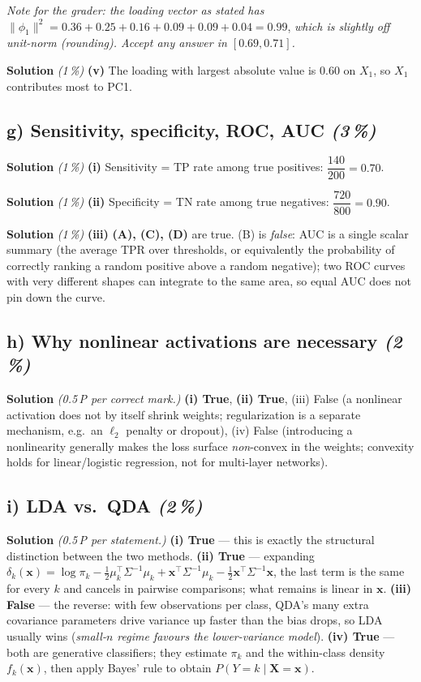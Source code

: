 \documentclass[11pt,a4paper]{article}
\newcommand{\subpoints}[1]{\textit{(#1\,\%)}}
\newcommand{\sol}{\noindent\textbf{Solution}}
\begin{document}
\noindent\emph{Note for the grader: the loading vector as stated has}
$\|\phi_1\|^2 = 0.36+0.25+0.16+0.09+0.09+0.04 = 0.99$,
\emph{which is slightly off unit-norm (rounding). Accept any answer in $[0.69,0.71]$.}

\medskip
\sol{} \subpoints{1} \textbf{(v)} The loading with largest absolute value is $0.60$ on $\boxed{X_1}$,
so $X_1$ contributes most to PC1.

\subsection*{g) Sensitivity, specificity, ROC, AUC \subpoints{3}}

\sol{} \subpoints{1} \textbf{(i)} Sensitivity = TP rate among true positives:
$\dfrac{140}{200} = \boxed{0.70}$.

\medskip
\sol{} \subpoints{1} \textbf{(ii)} Specificity = TN rate among true negatives:
$\dfrac{720}{800} = \boxed{0.90}$.

\medskip
\sol{} \subpoints{1} \textbf{(iii)} \textbf{(A), (C), (D)} are true. (B) is \emph{false}: AUC is a
single scalar summary (the average TPR over thresholds, or equivalently the probability of correctly
ranking a random positive above a random negative); two ROC curves with very different shapes can
integrate to the same area, so equal AUC does not pin down the curve.

\subsection*{h) Why nonlinear activations are necessary \subpoints{2}}
\sol{} \emph{(0.5\,P per correct mark.)}
\textbf{(i) True}, \textbf{(ii) True}, (iii) False (a nonlinear activation does not by itself shrink
weights; regularization is a separate mechanism, e.g.\ an $\ell_2$ penalty or dropout), (iv) False
(introducing a nonlinearity generally makes the loss surface \emph{non}-convex in the weights;
convexity holds for linear/logistic regression, not for multi-layer networks).

\subsection*{i) LDA vs.\ QDA \subpoints{2}}
\sol{} \emph{(0.5\,P per statement.)}
\textbf{(i) True} --- this is exactly the structural distinction between the two methods.
\textbf{(ii) True} --- expanding $\delta_k(\mathbf{x})=\log\pi_k - \tfrac{1}{2}\mu_k^\top\Sigma^{-1}\mu_k + \mathbf{x}^\top\Sigma^{-1}\mu_k - \tfrac{1}{2}\mathbf{x}^\top\Sigma^{-1}\mathbf{x}$, the last term is the same for every $k$ and cancels in pairwise comparisons; what remains is linear in $\mathbf{x}$.
\textbf{(iii) False} --- the reverse: with few observations per class, QDA's many extra covariance parameters drive variance up faster than the bias drops, so LDA usually wins (\emph{small-$n$ regime favours the lower-variance model}).
\textbf{(iv) True} --- both are generative classifiers; they estimate $\pi_k$ and the within-class density $f_k(\mathbf{x})$, then apply Bayes' rule to obtain $P(Y\!=\!k\mid\mathbf{X}\!=\!\mathbf{x})$.
\end{document}
